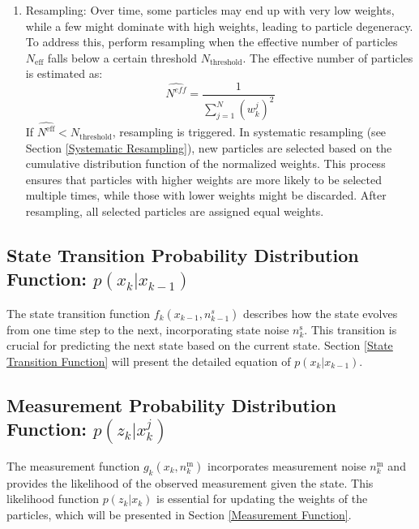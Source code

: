 \begin{enumerate}
    \item Resampling: Over time, some particles may end up with very low weights, while a few might dominate with high weights, leading to particle degeneracy. To address this, perform resampling when the effective number of particles \(N_{\text{eff}}\) falls below a certain threshold \(N_{\text{threshold}}\). The effective number of particles is estimated as:
    \begin{equation}\label{eq: effective number of particles}
        \widehat{N^{eff}} = \frac{1}{\sum_{j=1}^N ({w}_k^{j})^2}
    \end{equation}
    If \(\widehat{N^{\text{eff}}} < N_{\text{threshold}}\), resampling is triggered. In systematic resampling (see Section \ref{Systematic Resampling}), new particles are selected based on the cumulative distribution function of the normalized weights. This process ensures that particles with higher weights are more likely to be selected multiple times, while those with lower weights might be discarded. After resampling, all selected particles are assigned equal weights.
\end{enumerate}


\subsection{State Transition Probability Distribution Function: $p(x_k | x_{k-1})$}\label{State Transition Probability Function}

The state transition function \( f_k(x_{k-1}, n_{k-1}^s) \) describes how the state evolves from one time step to the next, incorporating state noise \( n_k^\text{s} \). This transition is crucial for predicting the next state based on the current state. Section \ref{State Transition Function} will present the detailed equation of $p(x_k | x_{k-1})$.

\subsection{Measurement Probability Distribution Function: $p(z_k | x_k^{j})$}\label{Measurement Probability Distribution Function}

The measurement function \( g_k(x_k, n_k^\text{m}) \) incorporates measurement noise \( n_k^\text{m} \) and provides the likelihood of the observed measurement given the state. This likelihood function \( p(z_k | x_k) \) is essential for updating the weights of the particles, which will be presented in Section \ref{Measurement Function}.

